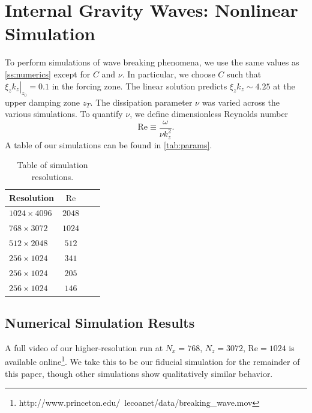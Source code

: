 \documentclass[
        fleqn,
        usenatbib,
    ]{mnras}
\newcommand*{\at}[1]{\left.#1\right|}
\begin{document}
\section{Internal Gravity Waves: Nonlinear Simulation}\label{s:sim}


To perform simulations of wave breaking phenomena, we use the same values as
\autoref{ss:numerics} except for $C$ and $\nu$. In particular, we choose $C$
such that $\at{\xi_z k_z}_{z_0} = 0.1$ in the forcing zone. The linear solution
predicts $\xi_z k_z \sim 4.25$ at the upper damping zone $z_T$. The dissipation
parameter $\nu$ was varied across the various simulations. To quantify $\nu$, we
define dimensionless Reynolds number
\begin{equation}
    \mathrm{Re}  \equiv \frac{\omega}{\nu k_{z}^2}. \label{eq:re_def}
\end{equation}
A table of our simulations can be found in \autoref{tab:params}.
\begin{table}
    \centering
    \begin{tabular}{l c c c}
        Resolution & $\mathrm{Re}$\\\bottomrule
        $1024 \times 4096$ & $2048$\\
        $768 \times 3072$ & $1024$\\
        $512 \times 2048$ & $512$\\
        $256 \times 1024$ & $341$\\
        $256 \times 1024$ & $205$\\
        $256 \times 1024$ & $146$\\
    \end{tabular}
    \caption{Table of simulation resolutions.}\label{tab:params}
\end{table}

\subsection{Numerical Simulation Results}\label{ss:nl_ns}

A full video of our higher-resolution run at $N_x = 768$, $N_z = 3072$,
$\mathrm{Re} = 1024$ is available
online\footnote{http://www.princeton.edu/~lecoanet/data/breaking\_wave.mov}. We
take this to be our fiducial simulation for the remainder of this paper, though
other simulations show qualitatively similar behavior.
\end{document}
